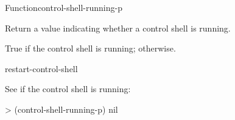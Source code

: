 \documentclass[10pt,twoside,english,pdftex]{article}
\begin{document}
\begin{functiondoc}{Function}{control-shell-running-p}{\noargs{}
    \returns{} }

\fnsyntax

\fnpurpose Return a value indicating whether a control shell is running.

\fnpackage {}

\fnmodule {}

\fnreturns True if the control shell is running; \nil{} otherwise.

\begin{alsos}{restart-control-shell}
\end{alsos}

\fnexample
See if the control shell is running:
\begin{example}
> (control-shell-running-p)
nil
\end{example}

\end{functiondoc}

\end{document}
